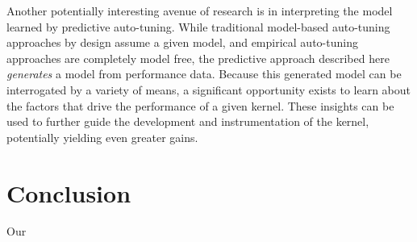 \documentclass{sig-alternate}
\begin{document}
Another potentially interesting avenue of research is in interpreting the model
learned by predictive auto-tuning.  While traditional model-based auto-tuning
approaches by design assume a given model, and empirical auto-tuning approaches
are completely model free, the predictive approach described here
\emph{generates} a model from performance data.  Because this generated model
can be interrogated by a variety of means, a significant opportunity exists to
learn about the factors that drive the performance of a given kernel.  These
insights can be used to further guide the development and instrumentation of
the kernel, potentially yielding even greater gains.



% 
% 

\section{Conclusion}

Our 


\end{document}
